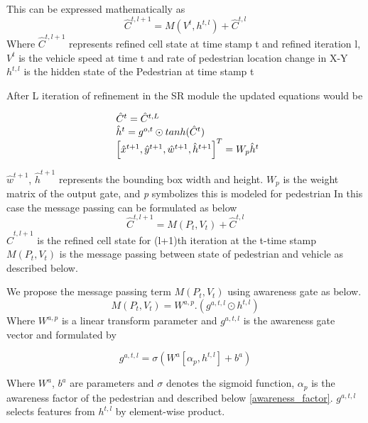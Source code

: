 %
This can be expressed mathematically as
\begin{equation}
\hat{C}^{t, l+1}= M(V^t, {h}^{t, l}) + \hat{C}^{t, l}
\end{equation}
Where $\hat{C}^{t, l+1}$ represents refined cell state at time stamp t and refined iteration l, $V^t$ is the vehicle speed at time t and rate of pedestrian location change in X-Y \\
${h}^{t, l}$ is the hidden state of the Pedestrian at time stamp t

After L iteration of refinement in the SR module the updated equations would be

\begin{equation}
\begin{array}{l@{}}
\hat{C}^{t}=\hat{C}^{t, L} \\
\hat{h}^{t}={g}^{o,t} \odot tanh(\hat{C}^{t}) \\
\left[ \hat{x}^{t+1}, \hat{y}^{t+1}, \hat{w}^{t+1}, \hat{h}^{t+1} \right] ^ T = W_p\hat{h}^{t}
\end{array}
\end{equation}

$\hat{w}^{t+1}$, $\hat{h}^{t+1}$ represents the bounding box width and height.
$W_p$ is the weight matrix of the output gate, and \textit{p} symbolizes this is modeled for pedestrian
%
In this case the message passing can be formulated as below 
\begin{equation}
\hat{C}^{t, l+1}=M(P_t, V_t) +  \hat{C}^{t, l}
\end{equation}
$\hat{C}^{t, l+1}$ is the refined cell state for (l+1)th iteration at the t-time stamp \\
$M(P_t, V_t)$ is the message passing between state of pedestrian and vehicle as described below.

We propose the message passing term $M(P_t, V_t)$ using awareness gate as below.
\begin{equation}
M(P_t, V_t) = W^{a,p}.(g^{a,t,l} \odot {h}^{t, l} ) 
\end{equation}
Where $W^{a,p}$ is a linear transform parameter and $g^{a,t,l}$ is the awareness gate vector and formulated by

\begin{equation}
g^{a,t,l} = \sigma(W^{a} [ \alpha_p, {h}^{t, l} ] + b^{a} ) 
\end{equation}

Where $W^{a}$, $b^{a}$ are parameters and $\sigma$ denotes the sigmoid function, $\alpha_p$ is the awareness factor of the pedestrian and described below \ref{awareness_factor}.
$g^{a,t,l}$ selects features from ${h}^{t, l}$ by element-wise product.

